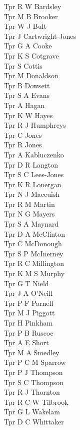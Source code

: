 \begin{multicols}{4}
  Tpr R W Bardsley \\
  Tpr M B Brooker \\
  Tpr W J Bult \\
  Tpr J Cartwright-Jones \\
  Tpr G A Cooke \\
  Tpr K S Cotgrave \\
  Tpr S Cottis \\
  Tpr M Donaldson \\
  Tpr B Dowsett \\
  Tpr S A Evans \\
  Tpr A Hagan \\
  Tpr K W Hayes \\
  Tpr R J Humphreys \\
  Tpr C Jones \\
  Tpr R Jones \\
  Tpr A Kabluczenko \\
  Tpr D R Langton \\
  Tpr S C Lees-Jones \\
  Tpr K R Lonergan \\
  Tpr N J Maccuish \\
  Tpr R M Martin \\
  Tpr N G Mayers \\
  Tpr S A Maynard \\
  Tpr D A McClinton \\
  Tpr C McDonough \\
  Tpr S P McInerney \\
  Tpr R C Millington \\
  Tpr K M S Murphy \\
  Tpr G T Nield \\
  Tpr J A O'Neill \\
  Tpr P F Parnell \\
  Tpr M J Piggott \\
  Tpr H Pinkham \\
  Tpr P B Ruscoe \\
  Tpr A E Short \\
  Tpr M A Smedley \\
  Tpr P C M Sparrow \\
  Tpr P J Thompson \\
  Tpr S C Thompson \\
  Tpr R J Thornton \\
  Tpr R C W Tilbrook \\
  Tpr G L Wakelam \\
  Tpr D C Whittaker \\

\end{multicols}
